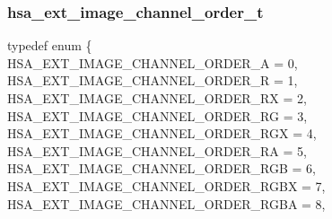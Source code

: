 \documentclass[final]{book}
\newcommand{\reftyp}[1]{#1}
\newcommand{\refenu}[1]{\reftyp{#1}}
\newenvironment{mylongtable}{\rowcolors{0}{lightgray}{lightgray}\longtable} {
\endlongtable}
\begin{document}
\subsubsection{hsa_\-ext_\-image_\-channel_\-order_\-t}
\vspace{-5.5mm}\begin{mylongtable}{@{}p{\textwidth}}
\rule{0pt}{3ex}typedef enum \{\\\hspace{1.7em}\hypertarget{group__ext-images_1ggabaced4fb1f3b9fdaa978e143af5ff055aa68ce325d9662ff1a1c78598835c8d55}{\refenu{HSA_\-EXT_\-IMAGE_\-CHANNEL_\-ORDER_\-A}} = 0,\\
\hspace{1.7em}\hypertarget{group__ext-images_1ggabaced4fb1f3b9fdaa978e143af5ff055ae6f5e256120da86e073db6a996e778d7}{\refenu{HSA_\-EXT_\-IMAGE_\-CHANNEL_\-ORDER_\-R}} = 1,\\
\hspace{1.7em}\hypertarget{group__ext-images_1ggabaced4fb1f3b9fdaa978e143af5ff055ad22499f0285b97596caa1a316f839ace}{\refenu{HSA_\-EXT_\-IMAGE_\-CHANNEL_\-ORDER_\-RX}} = 2,\\
\hspace{1.7em}\hypertarget{group__ext-images_1ggabaced4fb1f3b9fdaa978e143af5ff055a49185aef99188ff46b53d4da23614798}{\refenu{HSA_\-EXT_\-IMAGE_\-CHANNEL_\-ORDER_\-RG}} = 3,\\
\hspace{1.7em}\hypertarget{group__ext-images_1ggabaced4fb1f3b9fdaa978e143af5ff055a59e32fe3e15c24a407c5f1e56a6935f4}{\refenu{HSA_\-EXT_\-IMAGE_\-CHANNEL_\-ORDER_\-RGX}} = 4,\\
\hspace{1.7em}\hypertarget{group__ext-images_1ggabaced4fb1f3b9fdaa978e143af5ff055a7ec545d6291f17a9a779b6f673fad718}{\refenu{HSA_\-EXT_\-IMAGE_\-CHANNEL_\-ORDER_\-RA}} = 5,\\
\hspace{1.7em}\hypertarget{group__ext-images_1ggabaced4fb1f3b9fdaa978e143af5ff055ae3d2eed3398c973eab1e66e1b92a8efe}{\refenu{HSA_\-EXT_\-IMAGE_\-CHANNEL_\-ORDER_\-RGB}} = 6,\\
\hspace{1.7em}\hypertarget{group__ext-images_1ggabaced4fb1f3b9fdaa978e143af5ff055a3d93bdf6b20f6409a9d684646908bfe1}{\refenu{HSA_\-EXT_\-IMAGE_\-CHANNEL_\-ORDER_\-RGBX}} = 7,\\
\hspace{1.7em}\hypertarget{group__ext-images_1ggabaced4fb1f3b9fdaa978e143af5ff055a0c5e8dc0eef9af781786ef67ee3702df}{\refenu{HSA_\-EXT_\-IMAGE_\-CHANNEL_\-ORDER_\-RGBA}} = 8,\\

\end{mylongtable}
\end{document}
